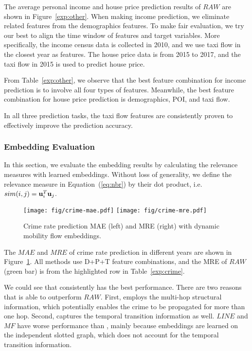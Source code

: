 The average personal income and house price prediction results of $RAW$ are shown in Figure~\ref{exp:other}. When making income prediction, we eliminate related features from the demographics features. To make fair evaluation, we try our best to align the time window of features and target variables. More specifically, the income census data is collected in 2010, and we use taxi flow in the closest year as features. The house price data is from 2015 to 2017, and the taxi flow in 2015 is used to predict house price.

From Table~\ref{exp:other}, we observe that the best feature combination for income prediction is to involve all four types of features. Meanwhile, the best feature combination for house price prediction is demographics, POI, and taxi flow.

In all three prediction tasks, the taxi flow features are consistently proven to effectively improve the prediction accuracy. 



\subsubsection{Embedding Evaluation}

In this section, we evaluate the embedding results by calculating the relevance measures with learned embeddings. Without loss of generality, we define the relevance measure in Equation~(\ref{eq:nbr}) by their dot product, i.e. $sim(i,j) = \mathbf{u}_i^T \mathbf{u}_j$.


\begin{figure}[h]
\centering
\texttt{[image: fig/crime-mae.pdf]}
\texttt{[image: fig/crime-mre.pdf]}
\vspace{-3mm}
\caption{Crime rate prediction MAE (left) and MRE (right) with dynamic mobility flow embeddings.}
\label{fig:crime}
\end{figure}


The $MAE$ and $MRE$ of crime rate prediction in different years are shown in Figure~\ref{fig:crime}. All methods use D+P+T feature combinations, and the MRE of $RAW$ (green bar) is from the highlighted row in Table~\ref{exp:crime}.

We could see that \dgef consistently has the best performance.  There are two reasons that \dgef is able to outperform $RAW$. First,  \dgef employs the multi-hop structural information, which potentially enables the crime to be propagated for more than one hop. Second, \dgef captures the temporal transition information as well.  $LINE$ and $MF$ have worse performance than \dgef, mainly because embeddings are learned on the independent slotted graph, which does not account for the temporal transition information.



